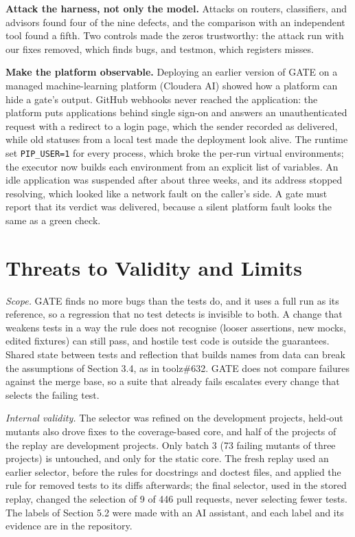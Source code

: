 \documentclass[conference]{IEEEtran}
\begin{document}
\textbf{Attack the harness, not only the model.} Attacks on routers, classifiers, and advisors found four of the nine defects, and the comparison with an independent tool found a fifth. Two controls made the zeros trustworthy: the attack run with our fixes removed, which finds bugs, and testmon, which registers misses.

\textbf{Make the platform observable.} Deploying an earlier version of GATE on a managed machine-learning platform (Cloudera AI) showed how a platform can hide a gate's output. GitHub webhooks never reached the application: the platform puts applications behind single sign-on and answers an unauthenticated request with a redirect to a login page, which the sender recorded as delivered, while old statuses from a local test made the deployment look alive. The runtime set \texttt{PIP\_USER=1} for every process, which broke the per-run virtual environments; the executor now builds each environment from an explicit list of variables. An idle application was suspended after about three weeks, and its address stopped resolving, which looked like a network fault on the caller's side. A gate must report that its verdict was delivered, because a silent platform fault looks the same as a green check.

\section{Threats to Validity and Limits}\label{threats-to-validity-and-limits}

\emph{Scope.} GATE finds no more bugs than the tests do, and it uses a full run as its reference, so a regression that no test detects is invisible to both. A change that weakens tests in a way the rule does not recognise (looser assertions, new mocks, edited fixtures) can still pass, and hostile test code is outside the guarantees. Shared state between tests and reflection that builds names from data can break the assumptions of Section 3.4, as in toolz\#632. GATE does not compare failures against the merge base, so a suite that already fails escalates every change that selects the failing test.

\emph{Internal validity.} The selector was refined on the development projects, held-out mutants also drove fixes to the coverage-based core, and half of the projects of the replay are development projects. Only batch 3 (73 failing mutants of three projects) is untouched, and only for the static core. The fresh replay used an earlier selector, before the rules for docstrings and doctest files, and applied the rule for removed tests to its diffs afterwards; the final selector, used in the stored replay, changed the selection of 9 of 446 pull requests, never selecting fewer tests. The labels of Section 5.2 were made with an AI assistant, and each label and its evidence are in the repository.
\end{document}
